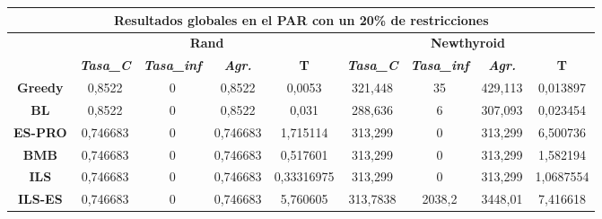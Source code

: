\documentclass[12pt, spanish]{article}
\begin{document}
\begin{table}[H]
\begin{tabular}{|c|c|c|c|c|c|c|c|c|}
\hline
\multicolumn{9}{|c|}{\textbf{Resultados globales en el PAR con un 20\% de restricciones}}                                                                                                                                               \\ \hline
\multicolumn{1}{|l|}{\multirow{2}{*}{}} & \multicolumn{4}{c|}{\textbf{Rand}}                                                            & \multicolumn{4}{c|}{\textbf{Newthyroid}}                                                      \\ \cline{2-9} 
\multicolumn{1}{|l|}{}                  & \textit{\textbf{Tasa\_C}} & \textit{\textbf{Tasa\_inf}} & \textit{\textbf{Agr.}} & \textbf{T} & \textit{\textbf{Tasa\_C}} & \textit{\textbf{Tasa\_inf}} & \textit{\textbf{Agr.}} & \textbf{T} \\ \hline
\textbf{Greedy}                         & 0,8522                    & 0                           & 0,8522                 & 0,0053     & 321,448                   & 35                          & 429,113                & 0,013897   \\ \hline
\textbf{BL}                             & 0,8522                    & 0                           & 0,8522                 & 0,031      & 288,636                   & 6                           & 307,093                & 0,023454   \\ \hline
\textbf{ES-PRO}                & 0,746683                  & 0                           & 0,746683               & 1,715114   & 313,299                   & 0                           & 313,299                & 6,500736   \\ \hline
\textbf{BMB}                            & 0,746683                  & 0                           & 0,746683               & 0,517601   & 313,299                   & 0                           & 313,299                & 1,582194   \\ \hline
\textbf{ILS}                            & 0,746683                  & 0                           & 0,746683               & 0,33316975 & 313,299                   & 0                           & 313,299                & 1,0687554  \\ \hline
\textbf{ILS-ES}                         & 0,746683                  & 0                           & 0,746683               & 5,760605   & 313,7838                  & 2038,2                      & 3448,01                & 7,416618   \\ \hline
\end{tabular}
\end{table}
\end{document}
